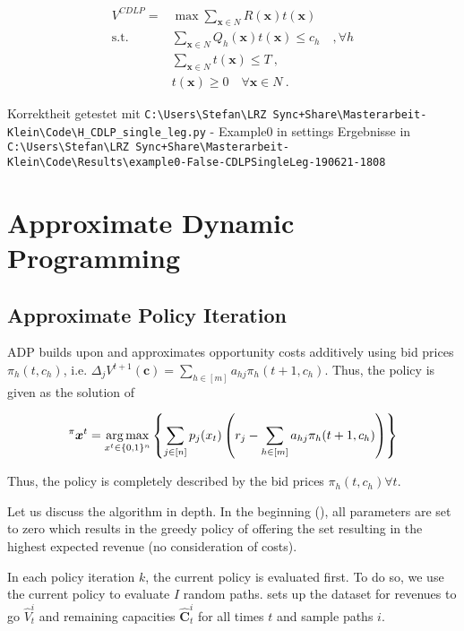 \begin{align}
	V^{CDLP} = & \max \sum_{\boldsymbol{x}\in N} R(\boldsymbol{x}) t(\boldsymbol{x})\\
	\text{s.t. } & \sum_{\boldsymbol{x}\in N} Q_h(\boldsymbol{x}) t(\boldsymbol{x}) \leq c_h \quad, \forall h\\
	& \sum_{\boldsymbol{x}\in N} t(\boldsymbol{x}) \leq T~,\\
	& t(\boldsymbol{x}) \geq 0 \quad \forall \boldsymbol{x} \in N~.
\end{align}

Korrektheit getestet mit \texttt{C:\textbackslash{}Users\textbackslash{}Stefan\textbackslash{}LRZ Sync+Share\textbackslash{}Masterarbeit-Klein\textbackslash{}Code\textbackslash{}H\_CDLP\_single\_leg.py} - Example0 in settings
Ergebnisse in \texttt{ C:\textbackslash{}Users\textbackslash{}Stefan\textbackslash{}LRZ Sync+Share\textbackslash{}Masterarbeit-Klein\textbackslash{}Code\textbackslash{}Results\textbackslash{}example0-False-CDLPSingleLeg-190621-1808}

\section{Approximate Dynamic Programming}

\subsection{Approximate Policy Iteration}

ADP builds upon  and approximates opportunity costs additively using bid prices $\pi_h(t, c_h)$, i.e. $\Delta_j V^{t+1}(\boldsymbol{c}) = \sum_{h \in [m]} a_{hj}\pi_{h}(t+1, c_h)$. Thus, the policy is given as the solution of

\begin{align}
^\pi \boldsymbol{x}^t = \operatorname*{arg\,max}_{x^t \in \{0,1\}^n}\left\{ \sum_{j \in [n]} p_j(x_t) \left( r_j - \sum_{h \in [m]} a_{hj}\pi_{h}(t+1, c_h) \right) \right\} 
\end{align}

Thus, the policy is completely described by the bid prices $\pi_h(t, c_h) \forall t$.

Let us discuss the algorithm in depth. In the beginning (), all parameters are set to zero which results in the greedy policy of offering the set resulting in the highest expected revenue (no consideration of costs). 

In each policy iteration $k$, the current policy is evaluated first. To do so, we use the current policy to evaluate $I$ random paths.  sets up the dataset for revenues to go $\hat{V}_t^i$ and remaining capacities $\mathbf{\hat{C}}_t^i$ for all times $t$ and sample paths $i$. 

